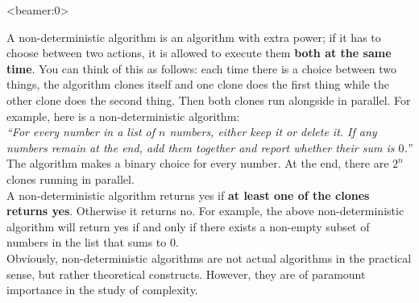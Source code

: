 \documentclass[handout, 12pt]{beamer}
\begin{document}
\begin{frame}<beamer:0>

\footnotesize
A non-deterministic algorithm is an algorithm with extra power; if it has to choose between two actions, it is allowed to execute them \textbf{both at the same time}. You can think of this as follows: each time there is a choice between two things, the algorithm clones itself and one clone does the first thing while the other clone does the second thing. Then both clones run alongside in parallel. For example, here is a non-deterministic algorithm:
\\[0.6em]
\textit{``For every number in a list of $n$ numbers, either keep it or delete it. If any numbers remain at the end, add them together and report whether their sum is $0$.''}
\\[0.6em]
The algorithm makes a binary choice for every number. At the end, there are $2^n$ clones running in parallel.
\\[0.6em]
A non-deterministic algorithm returns yes if \textbf{at least one of the clones returns yes}. Otherwise it returns no. For example, the above non-deterministic algorithm will return yes if and only if there exists a non-empty subset of numbers in the list that sums to $0$. 
\\[0.6em]
Obviously, non-deterministic algorithms are not actual algorithms in the practical sense, but rather theoretical constructs. However, they are of paramount importance in the study of complexity.

\end{frame}
\end{document}
